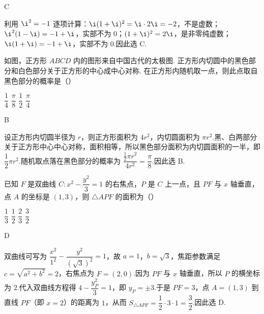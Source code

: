 \begin{answer}
C
\end{answer}

\begin{solution}
利用 \(\i^2=-1\) 逐项计算：\(\i(1+\i)^2=\i\cdot2\i=-2\)，不是虚数；\(\i^2(1-\i)=-1+\i\)，实部不为 \(0\)；\((1+\i)^2=2\i\)，是非零纯虚数；\(\i(1+\i)=-1+\i\)，实部不为 \(0\).因此选 C.
\end{solution}

\begin{problem}
如图，正方形 \(ABCD\) 内的图形来自中国古代的太极图. 正方形内切圆中的黑色部分和白色部分关于正方形的中心成中心对称. 在正方形内随机取一点，则此点取自黑色部分的概率是（\quad）


\choices
    {\(\dfrac{1}{4}\)}
    {\(\dfrac{\pi}{8}\)}
    {\(\dfrac{1}{2}\)}
    {\(\dfrac{\pi}{4}\)}
\end{problem}

\begin{answer}
B
\end{answer}

\begin{solution}
设正方形内切圆半径为 \(r\)，则正方形面积为 \(4r^2\)，内切圆面积为 \(\pi r^2\).黑、白两部分关于正方形中心中心对称，面积相等，所以黑色部分面积为内切圆面积的一半，即 \(\dfrac{1}{2}\pi r^2\).随机取点落在黑色部分的概率为 \(\dfrac{\frac12\pi r^2}{4r^2}=\dfrac{\pi}{8}\).因此选 B.
\end{solution}

\begin{problem}
已知 \(F\) 是双曲线 \(C:x^2-\dfrac{y^2}{3}=1\) 的右焦点，\(P\) 是 \(C\) 上一点，且 \(PF\) 与 \(x\) 轴垂直，点 \(A\) 的坐标是 \((1,3)\)，则 \(\triangle APF\) 的面积为（\quad）

\choices
    {\(\dfrac{1}{3}\)}
    {\(\dfrac{1}{2}\)}
    {\(\dfrac{2}{3}\)}
    {\(\dfrac{3}{2}\)}
\end{problem}

\begin{answer}
D
\end{answer}

\begin{solution}
双曲线可写为 \(\dfrac{x^2}{1^2}-\dfrac{y^2}{(\sqrt3)^2}=1\)，故 \(a=1\)，\(b=\sqrt3\)，焦距参数满足 \(c=\sqrt{a^2+b^2}=2\)，右焦点为 \(F=(2,0)\).因为 \(PF\) 与 \(x\) 轴垂直，所以 \(P\) 的横坐标为 \(2\).代入双曲线方程得 \(4-\dfrac{y_P^2}{3}=1\)，即 \(y_P=\pm3\).于是 \(PF=3\)，点 \(A=(1,3)\) 到直线 \(PF\)（即 \(x=2\)）的距离为 \(1\)，从而 \(S_{\triangle APF}=\dfrac12\cdot3\cdot1=\dfrac32\).因此选 D.
\end{solution}

